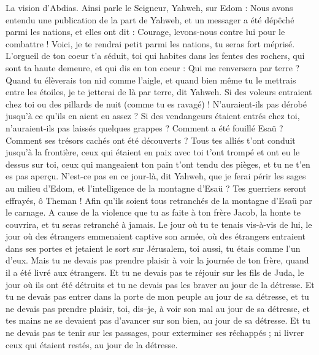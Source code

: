 \begin{multicols}{2}
\VerseOne{}La vision d'Abdias. Ainsi parle le Seigneur, Yahweh, sur Edom : Nous avons entendu une publication de la part de Yahweh, et un messager a été dépêché parmi les nations, et elles ont dit : Courage, levons-nous contre lui pour le combattre !
Voici, je te rendrai petit parmi les nations, tu seras fort méprisé.
L'orgueil de ton coeur t'a séduit, toi qui habites dans les fentes des rochers, qui sont ta haute demeure, et qui dis en ton coeur : Qui me renversera par terre ?
Quand tu élèverais ton nid comme l'aigle, et quand bien même tu le mettrais entre les étoiles, je te jetterai de là par terre, dit Yahweh.
Si des voleurs entraient chez toi ou des pillards de nuit (comme tu es ravagé) ! N'auraient-ils pas dérobé jusqu'à ce qu'ils en aient eu assez ? Si des vendangeurs étaient entrés chez toi, n'auraient-ils pas laissés quelques grappes ?
Comment a été fouillé Esaü ? Comment ses trésors cachés ont été découverts ?
Tous tes alliés t'ont conduit jusqu'à la frontière, ceux qui étaient en paix avec toi t'ont trompé et ont eu le dessus sur toi, ceux qui mangeaient ton pain t'ont tendu des pièges, et tu ne t'en es pas aperçu.
N'est-ce pas en ce jour-là, dit Yahweh, que je ferai périr les sages au milieu d'Edom, et l'intelligence de la montagne d'Esaü ?
Tes guerriers seront effrayés, ô Theman ! Afin qu'ils soient tous retranchés de la montagne d'Esaü par le carnage.
A cause de la violence que tu as faite à ton frère Jacob, la honte te couvrira, et tu seras retranché à jamais.
Le jour où tu te tenais vis-à-vis de lui, le jour où des étrangers emmenaient captive son armée, où des étrangers entraient dans ses portes et jetaient le sort sur Jérusalem, toi aussi, tu étais comme l'un d'eux.
Mais tu ne devais pas prendre plaisir à voir la journée de ton frère, quand il a été livré aux étrangers. Et tu ne devais pas te réjouir sur les fils de Juda, le jour où ils ont été détruits et tu ne devais pas les braver au jour de la détresse.
Et tu ne devais pas entrer dans la porte de mon peuple au jour de sa détresse, et tu ne devais pas prendre plaisir, toi, dis–je, à voir son mal au jour de sa détresse, et tes mains ne se devaient pas d'avancer sur son bien, au jour de sa détresse.
Et tu ne devais pas te tenir sur les passages, pour exterminer ses réchappés ; ni livrer ceux qui étaient restés, au jour de la détresse.

\end{multicols}
